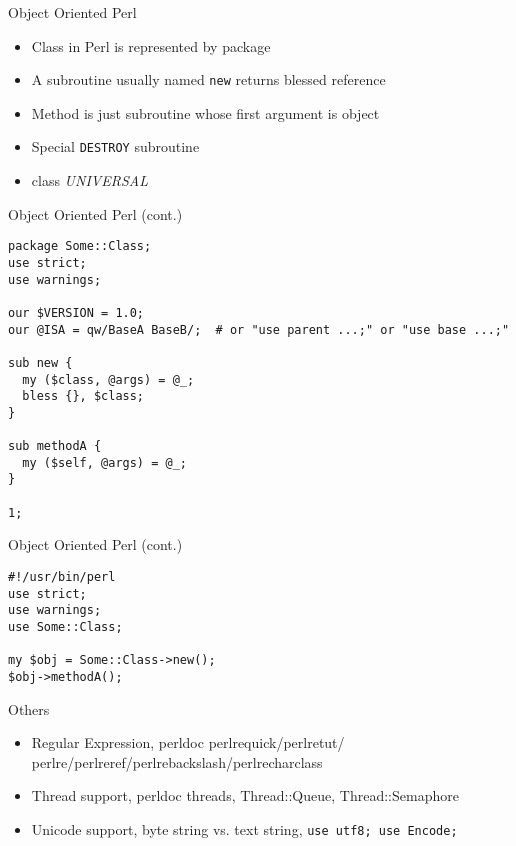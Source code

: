 \documentclass{beamer}
\begin{document}
\begin{frame}[containsverbatim]{Object Oriented Perl}
  \begin{itemize}
    \item Class in Perl is represented by package
    \item A subroutine usually named \texttt{new} returns blessed reference
    \item Method is just subroutine whose first argument is object
    \item Special \texttt{DESTROY} subroutine
    \item class \emph{UNIVERSAL}
  \end{itemize}
\end{frame}

\begin{frame}[containsverbatim]{Object Oriented Perl (cont.)}
\begin{lstlisting}[caption=Define a class]
package Some::Class;
use strict;
use warnings;

our $VERSION = 1.0;
our @ISA = qw/BaseA BaseB/;  # or "use parent ...;" or "use base ...;"

sub new {
  my ($class, @args) = @_;
  bless {}, $class;
}

sub methodA {
  my ($self, @args) = @_;
}

1;
\end{lstlisting}
\end{frame}

\begin{frame}[containsverbatim]{Object Oriented Perl (cont.)}
\begin{lstlisting}[caption=Use a class]
#!/usr/bin/perl
use strict;
use warnings;
use Some::Class;

my $obj = Some::Class->new();
$obj->methodA();
\end{lstlisting}
\end{frame}

\begin{frame}[containsverbatim]{Others}
  \begin{itemize}
    \item Regular Expression, perldoc perlrequick/perlretut/
          perlre/perlreref/perlrebackslash/perlrecharclass
    \item Thread support, perldoc threads, Thread::Queue, Thread::Semaphore
    \item Unicode support, byte string vs. text string, \lstinline{use utf8; use Encode;}
  \end{itemize}
\end{frame}
\end{document}
